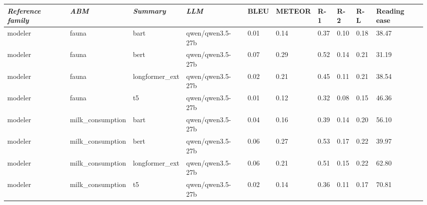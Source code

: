 \begin{tabular}{|l|l|l|l|l|l|l|l|l|l|}
\hline
\textit{\textbf{Reference family}} & \textit{\textbf{ABM}} & \textit{\textbf{Summary}} & \textit{\textbf{LLM}} & BLEU & METEOR & R-1 & R-2 & R-L & Reading ease \\
 \hline
 modeler & fauna & bart & qwen/qwen3.5-27b & 0.01 & 0.14 & 0.37 & 0.10 & 0.18 & 38.47 \\
 \hline
 modeler & fauna & bert & qwen/qwen3.5-27b & 0.07 & 0.29 & 0.52 & 0.14 & 0.21 & 31.19 \\
 \hline
 modeler & fauna & longformer\_ext & qwen/qwen3.5-27b & 0.02 & 0.21 & 0.45 & 0.11 & 0.21 & 38.54 \\
 \hline
 modeler & fauna & t5 & qwen/qwen3.5-27b & 0.01 & 0.12 & 0.32 & 0.08 & 0.15 & 46.36 \\
 \hline
 modeler & milk\_consumption & bart & qwen/qwen3.5-27b & 0.04 & 0.16 & 0.39 & 0.14 & 0.20 & 56.10 \\
 \hline
 modeler & milk\_consumption & bert & qwen/qwen3.5-27b & 0.06 & 0.27 & 0.53 & 0.17 & 0.22 & 39.97 \\
 \hline
 modeler & milk\_consumption & longformer\_ext & qwen/qwen3.5-27b & 0.06 & 0.21 & 0.51 & 0.15 & 0.22 & 62.80 \\
 \hline
 modeler & milk\_consumption & t5 & qwen/qwen3.5-27b & 0.02 & 0.14 & 0.36 & 0.11 & 0.17 & 70.81 \\
\hline
\end{tabular}

